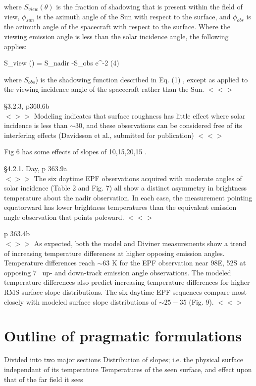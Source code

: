 \documentclass{article}
\newcommand{\qeq}{\hspace{25.mm}} %
\newcommand{\bq}{$ < \! > \!   \! >$ } %
\newcommand{\eq}{ $< \! \! < \! > $ } %
\begin{document}
where $S_{view} (\theta)$ is the fraction of shadowing that is present within
the field of view, $\phi_{sun}$ is the azimuth angle of the Sun with respect to
the surface, and $\phi_{obs}$ is the azimuth angle of the spacecraft with
respect to the surface. Where the viewing emission angle is less than the solar
incidence angle, the following applies:

\qb S_{view} (\theta) = S_{nadir} -S_{obs} \cdot e^{-2\tan{} } \qeq (4) \qe 

where $S_{obs}$) is the shadowing function described in Eq.  (1) , except as
applied to the viewing incidence angle of the spacecraft rather than the Sun.
 \eq

\S 3.2.3, p360.6b \\ \bq
Modeling indicates that surface roughness has little effect where solar
incidence is less than $\sim 30$\qd, and these observations can be considered
free of its interfering effects (Davidsson et al., submitted for publication) \eq

Fig 6 has some effects of slopes of 10,15,20,15 \qd.

\S 4.2.1. Day, p 363.9a \\ \bq 
The six daytime EPF observations acquired with moderate angles of
solar incidence (Table 2 and Fig. 7) all show a distinct asymmetry in
brightness temperature about the nadir observation.  In each case, the
measurement pointing equatorward has lower brightness temperatures than the
equivalent emission angle observation that points poleward. \eq

p 363.4b \\ \bq 
As expected, both the model and Diviner measurements show a trend of increasing
temperature differences at higher opposing emission angles. Temperature
differences reach $\sim 63$ K for the EPF observation near 98\qd E, 52\qd S at
opposing 7\qd~ up- and down-track emission angle observations. The modeled
temperature differences also predict increasing temperature differences for
higher RMS surface slope distributions. The six daytime EPF sequences compare
most closely with modeled surface slope distributions of $\sim 25 - 35 $ \qd
(Fig. 9). \eq

\section{Outline of pragmatic formulations}
Divided into two major sections
\qi Distribution of slopes; i.e. the physical surface independant of its temperature 
\qi Temperatures of the seen surface, and effect upon that of the far field it sees
\end{document}
